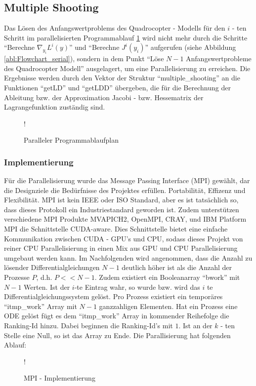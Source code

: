 \subsection{Multiple Shooting}
Das Lösen des Anfangswertproblems des Quadrocopter - Modells für den $i$ - ten Schritt im parallelisierten Programmablauf \ref{abl:Flowchart_parallel} wird nicht mehr durch die Schritte ``Berechne $\nabla_{y_i} L^{i}(y)$'' und ``Berechne $J^{i}(y_i)$'' aufgerufen (siehe Abbildung \ref{abl:Flowchart_serial}), sondern in dem Punkt ``Löse $N-1$ Anfangswertprobleme des Quadrocopter Modell'' ausgelagert, um eine Parallelisierung zu erreichen. Die Ergebnisse werden durch den Vektor der Struktur ``multiple\_shooting'' an die Funktionen ``getLD'' und ``getLDD'' übergeben, die für die Berechnung der Ableitung bzw. der Approximation Jacobi - bzw. Hessematrix der Lagrangefunktion zuständig sind.
\begin{figure}[H]
\centering
\resizebox {0.7\columnwidth} {!} {
  
  \label{abl:Flowchart_parallel}
}
\caption{Paralleler Programmablaufplan}
\end{figure}

\subsubsection{Implementierung}
Für die Parallelisierung wurde das Message Passing Interface (MPI) gewählt, dar die Designziele die Bedürfnisse des Projektes erfüllen. Portabilität, Effizenz und Flexibilität. MPI ist kein IEEE oder ISO Standard, aber es ist tatsächlich so, dass dieses Protokoll ein Industriestandard geworden ist. Zudem unterstützen verschiedene MPI Produkte MVAPICH2, OpenMPI, CRAY, und IBM Platform MPI die Schnittstelle CUDA-aware. Dies Schnittstelle bietet eine einfache Kommunikation zwischen CUDA - GPU's und CPU, sodass dieses Projekt von reiner CPU Parallelisierung in einen Mix aus GPU und CPU Parallelisierung umgebaut werden kann. Im Nachfolgenden wird angenommen, dass die Anzahl zu lösender Differentialgleichungen $N-1$ deutlich höher ist als die Anzahl der Prozesse $P$, d.h. $P << N - 1$. Zudem existiert ein Booleanarray ``bwork'' mit $N-1$ Werten. Ist der $i$-te Eintrag wahr, so wurde bzw. wird das $i$ te Differentialgleichungssystem gelöst. Pro Prozess existiert ein temporäres ``itmp\_work'' Array mit $N-1$ ganzzahligen Elementen. Hat ein Prozess eine ODE gelöst fügt es dem ``itmp\_work'' Array in kommender Reihefolge die Ranking-Id hinzu. Dabei beginnen die Ranking-Id's mit $1$. Ist an der $k$ - ten Stelle eine Null, so ist das Array zu Ende.
Die Parallisierung hat folgenden Ablauf:


\begin{figure}[H]
\centering
\resizebox {0.7\columnwidth} {!} {
  
  \label{abl:Flowchart_mpi}
}
\caption{MPI - Implementierung}
\end{figure}